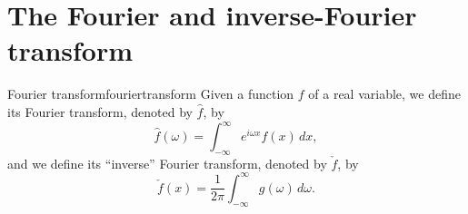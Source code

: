 
\section{The Fourier and inverse-Fourier transform}

\begin{defn}{Fourier transform}{fouriertransform}
	Given a function \(f\) of a real variable, we define its Fourier transform, denoted by \(\hat{f}\), by \[
		\hat{f}(\omega) = \int_{-\infty}^\infty e^{i\omega x} f(x)\,dx,
	\] 
	and we define its ``inverse'' Fourier transform, denoted by \(\check{f}\), by \[
		\check{f}(x) = \frac{1}{2\pi} \int_{-\infty}^{\infty} g(\omega)\,d\omega.
	\] 
\end{defn}
